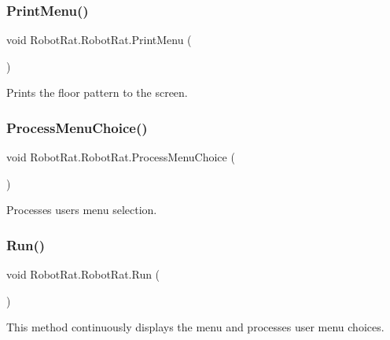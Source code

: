 \subsubsection{\texorpdfstring{Print\+Menu()}{PrintMenu()}}
{\footnotesize\ttfamily void Robot\+Rat.\+Robot\+Rat.\+Print\+Menu (\begin{DoxyParamCaption}{ }\end{DoxyParamCaption})}



Prints the floor pattern to the screen. 

\mbox{\label{class_robot_rat_1_1_robot_rat_ab481ea2a81b9ec687a98ec34ccf78b55}} 
\subsubsection{\texorpdfstring{Process\+Menu\+Choice()}{ProcessMenuChoice()}}
{\footnotesize\ttfamily void Robot\+Rat.\+Robot\+Rat.\+Process\+Menu\+Choice (\begin{DoxyParamCaption}{ }\end{DoxyParamCaption})}



Processes user\textquotesingle{}s menu selection. 

\mbox{\label{class_robot_rat_1_1_robot_rat_afeacab1cc8ebc4861c25e46066aa3279}} 
\subsubsection{\texorpdfstring{Run()}{Run()}}
{\footnotesize\ttfamily void Robot\+Rat.\+Robot\+Rat.\+Run (\begin{DoxyParamCaption}{ }\end{DoxyParamCaption})}



This method continuously displays the menu and processes user menu choices. 

\mbox{\label{class_robot_rat_1_1_robot_rat_a36ca12096468ac6d56caf2eef6d2fbdc}} 
